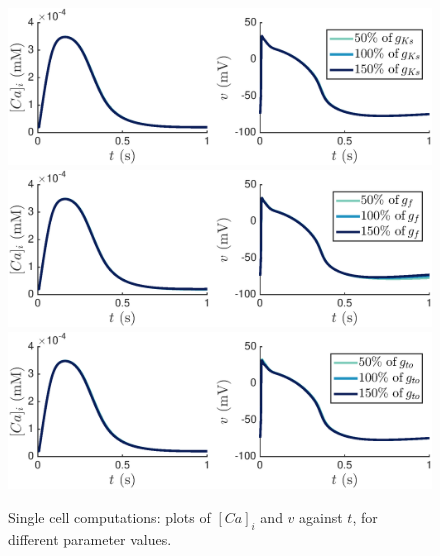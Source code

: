 \documentclass{article}
\begin{document}
%
\begin{figure}
   \includegraphics[trim=0cm 0cm 0cm 0cm, clip=true, width=1\linewidth]{sc_gks} 
   \includegraphics[trim=0cm 0cm 0cm 0cm, clip=true, width=1\linewidth]{sc_gf} 
      \includegraphics[trim=0cm 0cm 0cm 0cm, clip=true, width=1\linewidth]{sc_gto} 
    \caption{Single cell computations: plots of $[Ca]_i$ and $v$  against $t$, for different parameter values.}
    \label{fig:5a}
\end{figure}
%
\end{document}
